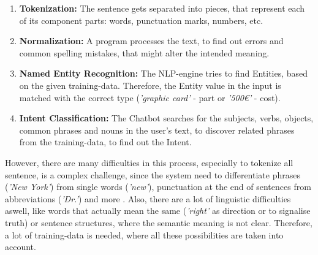 \documentclass[10pt,final,journal,a4paper,oneside,twocolumn]{IEEEtran}
\begin{document}
\begin{enumerate}
	\item \textbf{Tokenization:} The sentence gets separated into pieces, that represent each of its component parts: words, punctuation marks, numbers, etc.
	\item \textbf{Normalization:} A program processes the text, to find out errors and common spelling mistakes, that might alter the intended meaning.
	\item \textbf{Named Entity Recognition:} The NLP-engine tries to find Entities, based on the given training-data. Therefore, the Entity value in the input is matched with the correct type (\textit{'graphic card'} - part or \textit{'500\euro'} - cost).
	\item \textbf{Intent Classification:} The Chatbot searches for the subjects, verbs, objects, common phrases and nouns in the user’s text, to discover related phrases from the training-data, to find out the Intent.
\end{enumerate}
However, there are many difficulties in this process, especially to tokenize all sentence, is a complex challenge, since the system need to differentiate phrases (\textit{'New York'}) from single words (\textit{'new'}), punctuation at the end of sentences from abbreviations (\textit{'Dr.'}) and more \cite{b6}. Also, there are a lot of linguistic difficulties aswell, like words that actually mean the same (\textit{'right'} as direction or to signalise truth) or sentence structures, where the semantic meaning is not clear. Therefore, a lot of training-data is needed, where all these possibilities are taken into account.
\\
\end{document}

